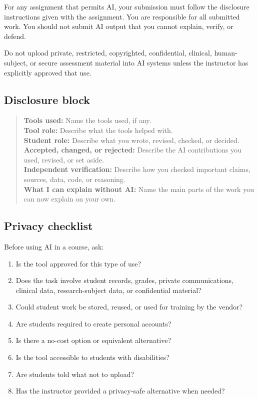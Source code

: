 \documentclass{SIAMbook2023}
\begin{document}
For any assignment that permits AI, your submission must follow the disclosure instructions given with the assignment. You are responsible for all submitted work. You should not submit AI output that you cannot explain, verify, or defend.

Do not upload private, restricted, copyrighted, confidential, clinical, human-subject, or secure assessment material into AI systems unless the instructor has explicitly approved that use.

\subsection{Disclosure block}
\label{u:app:disclosure-block}

\begin{quote}
\textbf{Tools used:} Name the tools used, if any.\\
\textbf{Tool role:} Describe what the tools helped with.\\
\textbf{Student role:} Describe what you wrote, revised, checked, or decided.\\
\textbf{Accepted, changed, or rejected:} Describe the AI contributions you used, revised, or set aside.\\
\textbf{Independent verification:} Describe how you checked important claims, sources, data, code, or reasoning.\\
\textbf{What I can explain without AI:} Name the main parts of the work you can now explain on your own.
\end{quote}

\subsection{Privacy checklist}
\label{u:app:privacy-checklist}

Before using AI in a course, ask:

\begin{enumerate}
  \item Is the tool approved for this type of use?
  \item Does the task involve student records, grades, private communications, clinical data, research-subject data, or confidential material?
  \item Could student work be stored, reused, or used for training by the vendor?
  \item Are students required to create personal accounts?
  \item Is there a no-cost option or equivalent alternative?
  \item Is the tool accessible to students with disabilities?
  \item Are students told what not to upload?
  \item Has the instructor provided a privacy-safe alternative when needed?
\end{enumerate}
\end{document}
